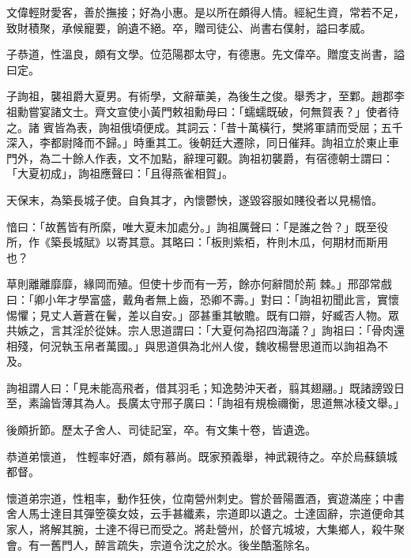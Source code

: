 \begin{pinyinscope}
 文偉輕財愛客，善於撫接；好為小惠。是以所在頗得人情。經紀生資，常若不足，致財積聚，承候寵要，餉遺不絕。卒，贈司徒公、尚書右僕射，謚曰孝威。



 子恭道，性溫良，頗有文學。位范陽郡太守，有德惠。先文偉卒。贈度支尚書，謚曰定。



 子詢祖，襲祖爵大夏男。有術學，文辭華美，為後生之俊。舉秀才，至鄴。趙郡李祖勳嘗宴諸文士。齊文宣使小黃門敕祖勳母曰：「蠕蠕既破，何無賀表？」使者待之。諸
 賓皆為表，詢祖俄頃便成。其詞云：「昔十萬橫行，樊將軍請而受屈；五千深入，李都尉降而不歸。」時重其工。後朝廷大遷除，同日催拜。詢祖立於東止車門外，為二十餘人作表，文不加點，辭理可觀。詢祖初襲爵，有宿德朝士謂曰：「大夏初成」，詢祖應聲曰：「且得燕雀相賀」。



 天保末，為築長城子使。自負其才，內懷鬱怏，遂毀容服如賤役者以見楊愔。



 愔曰：「故舊皆有所縻，唯大夏未加處分。」詢祖厲聲曰：「是誰之咎？」既至役所，作《築長城賦》以寄其意。其略曰：「板則紫栢，杵則木瓜，何期材而斯用也？



 草則離離靡靡，緣岡而殖。但使十步而有一芳，餘亦何辭間於荊
 棘。」邢邵常戲曰：「卿小年才學富盛，戴角者無上齒，恐卿不壽。」對曰：「詢祖初聞此言，實懷惕懼；見丈人蒼蒼在鬢，差以自安。」邵甚重其敏贍。既有口辯，好臧否人物。眾共嫉之，言其淫於從妹。宗人思道謂曰：「大夏何為招四海議？」詢祖曰：「骨肉還相殘，何況執玉帛者萬國。」與思道俱為北州人俊，魏收楊譽思道而以詢祖為不及。



 詢祖謂人曰：「見未能高飛者，借其羽毛；知逸勢沖天者，翦其翅翮。」既諸謗毀日至，素論皆薄其為人。長廣太守邢子廣曰：「詢祖有規檢禰衡，思道無冰稜文舉。」



 後頗折節。歷太子舍人、司徒記室，卒。有文集十卷，皆遺逸。



 恭道弟懷道，
 性輕率好酒，頗有慕尚。既家預義舉，神武親待之。卒於烏蘇鎮城都督。



 懷道弟宗道，性粗率，動作狂俠，位南營州刺史。嘗於晉陽置酒，賓遊滿座；中書舍人馬士達目其彈箜篌女妓，云手甚纖素，宗道即以遺之。士達固辭，宗道便命其家人，將解其腕，士達不得已而受之。將赴營州，於督亢城坡，大集鄉人，殺牛聚會。有一舊門人，醉言疏失，宗道令沈之於水。後坐酷濫除名。




\end{pinyinscope}
